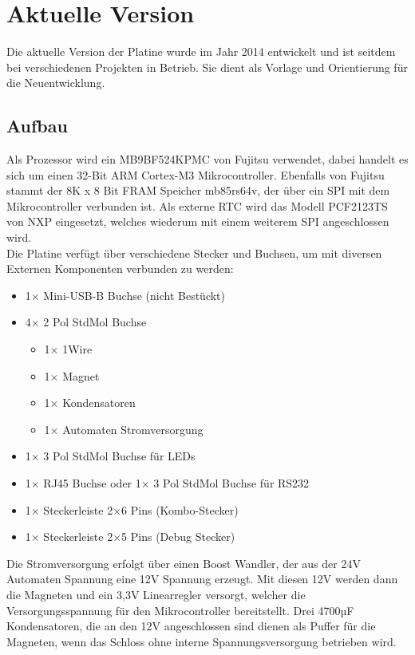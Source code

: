 
\chapter{Aktuelle Version}
Die aktuelle Version der Platine wurde im Jahr 2014 entwickelt und ist seitdem bei verschiedenen Projekten in Betrieb.
Sie dient als Vorlage und Orientierung für die Neuentwicklung.

\section{Aufbau}
Als Prozessor wird ein MB9BF524KPMC von Fujitsu verwendet, dabei handelt es sich um einen 32-Bit ARM Cortex-M3 Mikrocontroller.
Ebenfalls von Fujitsu stammt der 8K x 8 Bit \ac{FRAM} Speicher mb85rs64v, der über ein \ac{SPI} mit dem Mikrocontroller
verbunden ist. Als externe \ac{RTC} wird das Modell PCF2123TS von NXP eingesetzt, welches wiederum mit einem weiterem \ac{SPI}
angeschlossen wird.\\
Die Platine verfügt über verschiedene Stecker und Buchsen, um mit diversen Externen Komponenten verbunden zu werden:
\begin{itemize}
    \item 1\(\times\) Mini-USB-B Buchse (nicht Bestückt)
    \item 4\(\times\) 2 Pol StdMol Buchse
          \begin{itemize}
              \item 1\(\times\) 1Wire
              \item 1\(\times\) Magnet
              \item 1\(\times\) Kondensatoren
              \item 1\(\times\) Automaten Stromversorgung
          \end{itemize}
    \item 1\(\times\) 3 Pol StdMol Buchse für LEDs
    \item 1\(\times\) RJ45 Buchse oder 1\(\times\) 3 Pol StdMol Buchse für RS232
    \item 1\(\times\) Steckerleiste 2\(\times\)6 Pins (Kombo-Stecker)
    \item 1\(\times\) Steckerleiste 2\(\times\)5 Pins (Debug Stecker)
\end{itemize}
Die Stromversorgung erfolgt über einen Boost Wandler, der aus der 24V Automaten Spannung eine 12V Spannung erzeugt. Mit diesen 12V
werden dann die Magneten und ein 3,3V Linearregler versorgt, welcher die Versorgungsspannung für den Mikrocontroller bereitstellt.
Drei 4700µF Kondensatoren, die an den 12V angeschlossen sind dienen als Puffer für die Magneten, wenn das Schloss ohne interne 
Spannungsversorgung betrieben wird.

